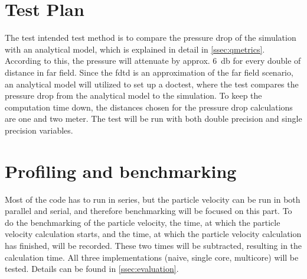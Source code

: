 \section{Test Plan}
The test intended test method is to compare the pressure drop of the simulation with an analytical model, which is explained in detail in \autoref{ssec:qmetrics}. According to this, the pressure will attenuate by approx. \SI{6}{\decibel} for every double of distance in far field. Since the \gls{fdtd} is an approximation of the far field scenario, an analytical model will utilized to set up a doctest, where the test compares the pressure drop from the analytical model to the simulation. To keep the computation time down, the distances chosen for the pressure drop calculations are one and two meter. The test will be run with both double precision and single precision variables.

\section{Profiling and benchmarking}
Most of the code has to run in series, but the particle velocity can be run in both parallel and serial, and therefore benchmarking will be focused on this part. To do the benchmarking of the particle velocity, the time, at which the particle velocity calculation starts, and the time, at which the particle velocity calculation has finished, will be recorded. These two times will be subtracted, resulting in the calculation time. All three implementations (naive, single core, multicore) will be tested. Details can be found in \autoref{ssec:evaluation}.




